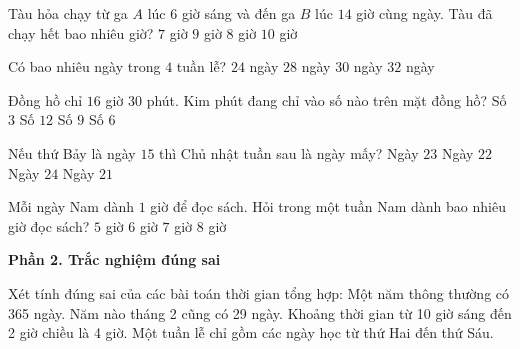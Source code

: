 \begin{ex} %
Tàu hỏa chạy từ ga $A$ lúc $6$ giờ sáng và đến ga $B$ lúc $14$ giờ cùng ngày. Tàu đã chạy hết bao nhiêu giờ?
\choice
{$7$ giờ}
{$9$ giờ}
{\True $8$ giờ}
{$10$ giờ}
\end{ex}

\begin{ex} %
Có bao nhiêu ngày trong $4$ tuần lễ?
\choice
{$24$ ngày}
{\True $28$ ngày}
{$30$ ngày}
{$32$ ngày}
\end{ex}

\begin{ex} %
Đồng hồ chỉ $16$ giờ $30$ phút. Kim phút đang chỉ vào số nào trên mặt đồng hồ?
\choice
{Số $3$}
{Số $12$}
{Số $9$}
{\True Số $6$}
\end{ex}

\begin{ex} %
Nếu thứ Bảy là ngày $15$ thì Chủ nhật tuần sau là ngày mấy?
\choice
{\True Ngày $23$}
{Ngày $22$}
{Ngày $24$}
{Ngày $21$}
\end{ex}

\begin{ex} %
Mỗi ngày Nam dành $1$ giờ để đọc sách. Hỏi trong một tuần Nam dành bao nhiêu giờ đọc sách?
\choice
{$5$ giờ}
{$6$ giờ}
{\True $7$ giờ}
{$8$ giờ}
\end{ex}

\textbf{Phần 2. Trắc nghiệm đúng sai}

\begin{ex} %
Xét tính đúng sai của các bài toán thời gian tổng hợp:
\choiceTF
{\True Một năm thông thường có 365 ngày.}
{Năm nào tháng 2 cũng có 29 ngày.}
{\True Khoảng thời gian từ 10 giờ sáng đến 2 giờ chiều là 4 giờ.}
{Một tuần lễ chỉ gồm các ngày học từ thứ Hai đến thứ Sáu.}
\end{ex}

